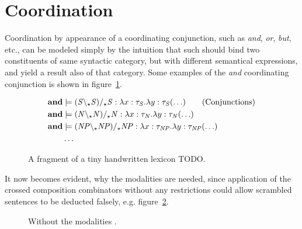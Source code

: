 \section{Coordination}
Coordination by appearance of a coordinating conjunction, such as \emph{and}, \emph{or}, \emph{but}, etc., can be modeled simply by the intuition that such should bind two constituents of same syntactic category, but with different semantical expressions, and yield a result also of that category. Some examples of the \emph{and} coordinating conjunction is shown in figure~\ref{fig:conjunctionLex}.
\begin{figure}[ht]
\vspace{-.5em}
\begin{align*}
  \mathbf{and}       &\models ({\mathit{S}} \backslash_\star {\mathit{S}}) /_\star {\mathit{S}}    : \lambda x : \tau_{\mathit{S}} . \lambda y : \tau_{\mathit{S}} (\ldots)    \tag{Conjunctions} \\
  \mathbf{and}       &\models ({\mathit{N}} \backslash_\star {\mathit{N}}) /_\star {\mathit{N}}    : \lambda x : \tau_{\mathit{N}} . \lambda y : \tau_{\mathit{N}} (\ldots)     \\
  \mathbf{and}       &\models ({\mathit{NP}} \backslash_\star {\mathit{NP}}) /_\star {\mathit{NP}} : \lambda x : \tau_{\mathit{NP}} . \lambda y : \tau_{\mathit{NP}} (\ldots)  \\
  &\hdots 
\end{align*}
\vspace{-1.5em}
\caption{A fragment of a tiny handwritten lexicon TODO.}
\label{fig:conjunctionLex}
\end{figure}

It now becomes evident, why the modalities are needed, since application of the crossed composition combinators without any restrictions could allow scrambled sentences to be deducted falsely, e.g. figure~\ref{fig:withoutModalities}. 
\begin{figure}[ht]
\center
{}
\caption{Without the modalities .}
\label{fig:withoutModalities}
\vspace{-.5em}
\end{figure}

